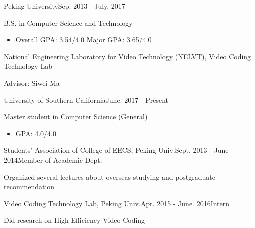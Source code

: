 \documentclass{joel_cv}
\begin{document}
\pagestyle{empty}

\begin{cvHeader} 
\end{cvHeader}

%
%

\begin{sectionContentSimple}{Peking University}{Sep. 2013 - July. 2017}
	\item B.S. in Computer Science and Technology
	\begin{itemize}
		\item Overall GPA: 3.54/4.0 \quad Major GPA: 3.65/4.0
	\end{itemize}
	\item National Engineering Laboratory for Video Technology (NELVT), Video Coding Technology Lab
	\item Advisor: Siwei Ma
\end{sectionContentSimple}

\begin{sectionContentSimple}{University of Southern California}{June. 2017 - Present}
	\item Master student in Computer Science (General)
	\begin{itemize}
		\item GPA: 4.0/4.0
	\end{itemize}
\end{sectionContentSimple}


%
%


\begin{sectionContentNormal}{Students' Association of College of EECS, Peking Univ.}{Sept. 2013 - June 2014}{Member of Academic Dept.}
	\item Organized several lectures about overseas studying and postgraduate recommendation
\end{sectionContentNormal}

\begin{sectionContentNormal}{Video Coding Technology Lab, Peking Univ.}{Apr. 2015 - June. 2016}{Intern}
	\item Did research on High Efficiency Video Coding
\end{sectionContentNormal}
\end{document}
